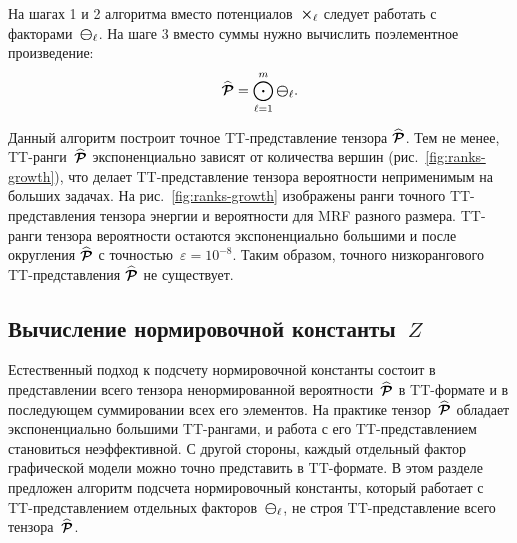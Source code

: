 На шагах 1 и 2 алгоритма вместо потенциалов~$\boldsymbol{\mathcal{\Theta}}_\ell$ следует работать с факторами~$\boldsymbol{\mathcal{\Psi}}_{\ell}$. На шаге 3 вместо суммы нужно вычислить поэлементное произведение:
\begin{equation}
\widehat{\boldsymbol{\mathcal{P}}} =   \bigodot_{\ell = 1}^{m} \boldsymbol{\mathcal{\Psi}}_{\ell}.
\end{equation}

Данный алгоритм построит точное TT\hyp{}представление тензора $\widehat{\boldsymbol{\mathcal{P}}}$. Тем не менее, TT\hyp{}ранги~$\widehat{\boldsymbol{\mathcal{P}}}$ экспоненциально зависят от количества вершин (рис.~\ref{fig:ranks-growth}), что делает TT\hyp{}представление тензора вероятности неприменимым на больших задачах. На рис.~\ref{fig:ranks-growth} изображены ранги точного TT-представления тензора энергии и вероятности для MRF разного размера. TT\hyp{}ранги тензора вероятности остаются экспоненциально большими и после округления $\widehat{\boldsymbol{\mathcal{P}}}$ с точностью~$\varepsilon = 10^{-8}$. Таким образом, точного низкорангового TT\hyp{}представления $\widehat{\boldsymbol{\mathcal{P}}}$ не существует.



\subsection{Вычисление нормировочной константы~$Z$}
\label{sec:partition-function}
Естественный подход к подсчету нормировочной константы состоит в представлении всего тензора ненормированной вероятности~$\widehat{\boldsymbol{\mathcal{P}}}$ в TT\hyp{}формате и в последующем суммировании всех его элементов. На практике тензор~$\widehat{\boldsymbol{\mathcal{P}}}$ обладает экспоненциально большими TT\hyp{}рангами, и работа с его TT\hyp{}представлением становиться неэффективной. С другой стороны, каждый отдельный фактор графической модели можно точно представить в TT\hyp{}формате. В этом разделе предложен алгоритм подсчета нормировочный константы, который работает с TT\hyp{}представлением отдельных факторов~$\boldsymbol{\mathcal{\Psi}}_{\ell}$, не строя TT\hyp{}представление всего тензора~$\widehat{\boldsymbol{\mathcal{P}}}$.

